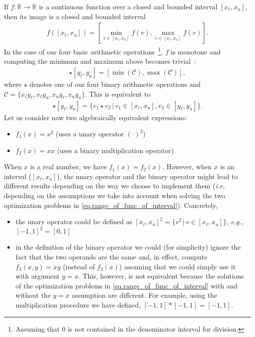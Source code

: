 \documentclass[12pt,a4paper]{article}
\begin{document}
If $f: \mathbb{R} \to \mathbb{R}$ is a continuous function over a closed and bounded
interval $[x_{\ell}, x_u]$, then its image is a closed and bounded interval
\begin{align} \label{eq.range_of_func_of_interval}
  f([x_{\ell}, x_u]) = \left[\min_{v\in[x_{\ell}, x_u]}f(v), \max_{v\in[x_{\ell}, x_u]}f(v)\right].
\end{align}
In the case of our four basic arithmetic operations~\footnote{Assuming that 0 is not
contained in the denominator interval for division.}, $f$ is monotone and computing the
minimum and maximum above becomes trivial~\cite{interval-operators}:
\begin{align*}
  [x_{\ell}, x_u] \star [y_{\ell}, y_u] = [\min(\mathcal{C}), \max(\mathcal{C})],
\end{align*}
where $\star$ denotes one of our four binary arithmetic operations and $\mathcal{C} =
\{x_{\ell}y_{\ell}, x_{\ell}y_{u}, x_{u}y_{\ell}, x_{u}y_{u}\}$. This is equivalent to
\begin{align*}
  [x_{\ell}, x_u] \star [y_{\ell}, y_u] = \{v_1 \star v_2 \, | \, v_1 \in [x_{\ell}, x_u], v_2 \in [y_{\ell}, y_u]\}.
\end{align*}
Let us consider now two algebraically equivalent expressions:
\begin{itemize}
\item $f_1(x) = x^2$ (uses a unary operator $(\cdot)^2$)
\item $f_2(x) = xx$ (uses a binary multiplication operator)
\end{itemize}
When $x$ is a real number, we have $f_1(x) = f_2(x)$. However, when $x$ is an interval
($[x_{\ell}, x_u]$), the unary operator and the binary operator might lead to different
results depending on the way we choose to implement them (\emph{i.e,} depending on the
assumptions we take into account when solving the two optimization problems in
\eqref{eq.range_of_func_of_interval}). Concretely,
\begin{itemize}
\item the unary operator could be defined as $[x_{\ell}, x_u]^2 = \{v^2 \, | \,
  v\in[x_{\ell}, x_u]\}$, \emph{e.g.,} $[-1, 1]^2 = [0, 1]$
\item in the definition of the binary operator we could (for simplicity) ignore the fact
  that the two operands are the same and, in effect, compute $f_3(x, y) = xy$ (instead
  of $f_2(x)$) assuming that we could simply use it with argument $y = x$. This,
  however, is not equivalent because the solutions of the optimization problems in
  \eqref{eq.range_of_func_of_interval} with and without the $y=x$ assumption are
  different. For example, using the multiplication procedure we have defined, $[-1, 1] *
  [-1, 1] = [-1, 1]$.
\end{itemize}
\end{document}
